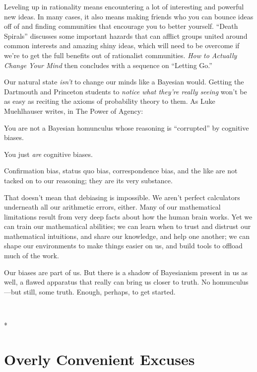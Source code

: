 {
 Leveling up in rationality means encountering a lot of interesting
and powerful new ideas. In many cases, it also means making friends who
you can bounce ideas off of and finding communities that encourage you
to better yourself. ``Death
Spirals'' discusses some important hazards that can
afflict groups united around common interests and amazing shiny ideas,
which will need to be overcome if we're to get the full
benefits out of rationalist communities. \textit{How to Actually Change
Your Mind} then concludes with a sequence on ``Letting
Go.''}

{
 Our natural state \textit{isn't} to change our
minds like a Bayesian would. Getting the Dartmouth and Princeton
students to \textit{notice what they're really seeing}
won't be as easy as reciting the axioms of probability
theory to them. As Luke Muehlhauser writes, in The Power of
Agency:}

{
 You are not a Bayesian homunculus whose reasoning is
``corrupted'' by cognitive biases.}

{
 You just \textit{are} cognitive biases.}

{
 Confirmation bias, status quo bias, correspondence bias, and the
like are not tacked on to our reasoning; they are its very substance.}

{
 That doesn't mean that debiasing is impossible. We
aren't perfect calculators underneath all our
arithmetic errors, either. Many of our mathematical limitations result
from very deep facts about how the human brain works. Yet we can train
our mathematical abilities; we can learn when to trust and distrust our
mathematical intuitions, and share our knowledge, and help one another;
we can shape our environments to make things easier on us, and build
tools to offload much of the work.}

{
 Our biases are part of us. But there is a shadow of Bayesianism
present in us as well, a flawed apparatus that really can bring us
closer to truth. No homunculus---but still, some truth. Enough,
perhaps, to get started.}

{
 ~}

{\centering
 *
\par}


\bigskip

\chapter{Overly Convenient Excuses}

